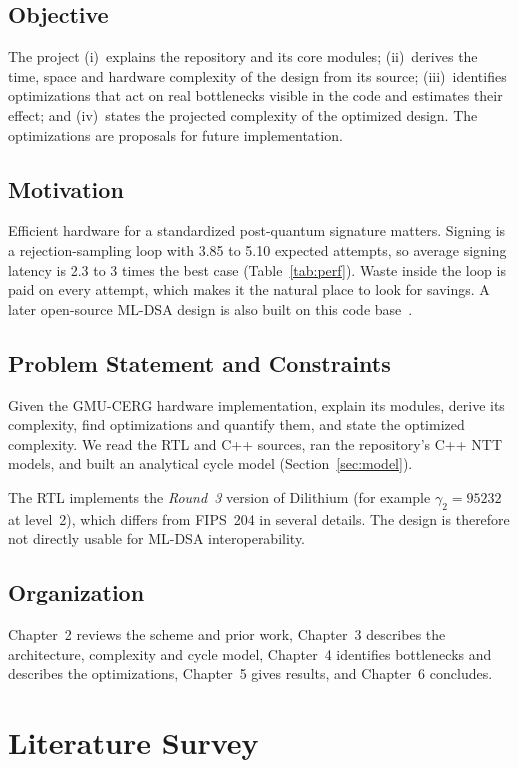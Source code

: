 \documentclass[12pt,a4paper]{report}
\begin{document}
\section{Objective}
The project (i)~explains the repository and its core modules; (ii)~derives the time, space and hardware complexity of the design from its source; (iii)~identifies optimizations that act on real bottlenecks visible in the code and estimates their effect; and (iv)~states the projected complexity of the optimized design. The optimizations are proposals for future implementation.

\section{Motivation}
Efficient hardware for a standardized post-quantum signature matters. Signing is a rejection-sampling loop with 3.85 to 5.10 expected attempts, so average signing latency is 2.3 to 3 times the best case (Table~\ref{tab:perf}). Waste inside the loop is paid on every attempt, which makes it the natural place to look for savings. A later open-source ML-DSA design is also built on this code base~\cite{norga2026}.

\section{Problem Statement and Constraints}
Given the GMU-CERG hardware implementation, explain its modules, derive its complexity, find optimizations and quantify them, and state the optimized complexity. We read the RTL and C++ sources, ran the repository's C++ NTT models, and built an analytical cycle model (Section~\ref{sec:model}).

The RTL implements the \emph{Round~3} version of Dilithium (for example $\gamma_2=95232$ at level~2), which differs from FIPS~204 in several details. The design is therefore not directly usable for ML-DSA interoperability.

\section{Organization}
Chapter~2 reviews the scheme and prior work, Chapter~3 describes the architecture, complexity and cycle model, Chapter~4 identifies bottlenecks and describes the optimizations, Chapter~5 gives results, and Chapter~6 concludes.

\chapter{Literature Survey}
\end{document}
